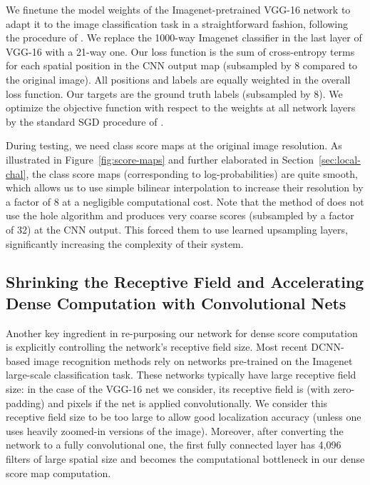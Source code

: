 We finetune the model weights of the Imagenet-pretrained VGG-16 network to
adapt it to the image classification task in a straightforward fashion,
following the procedure of \cite{long2014fully}. We replace the 1000-way
Imagenet classifier in the last layer of VGG-16 with a 21-way one. Our loss
function is the sum of cross-entropy terms for each spatial position in the
CNN output map (subsampled by 8 compared to the original image). All positions
and labels are equally weighted in the overall loss function. Our targets are
the ground truth labels (subsampled by 8). We optimize the objective function
with respect to the weights at all network layers by the standard SGD
procedure of \cite{KrizhevskyNIPS2013}.

During testing, we need class score maps at the original image resolution. As
illustrated in Figure~\ref{fig:score-maps} and further elaborated in
Section~\ref{sec:local-chal}, the class score maps (corresponding to
log-probabilities) are quite smooth, which allows us to use simple bilinear
interpolation to increase their resolution by a factor of 8 at a negligible
computational cost. Note that the method of \cite{long2014fully} does not use
the hole algorithm and produces very coarse scores (subsampled by a factor of
32) at the CNN output. This forced them to use learned upsampling layers,
significantly increasing the complexity of their system.

\subsection{Shrinking the Receptive Field and Accelerating Dense Computation
  with Convolutional Nets}
\label{sec:convnet-field}

Another key ingredient in re-purposing our network for dense score computation
is explicitly controlling the network's receptive field size. Most recent
DCNN-based image recognition methods rely on networks pre-trained on the
Imagenet large-scale classification task. These networks typically have large
receptive field size: in the case of the VGG-16 net we consider, its receptive
field is  (with zero-padding) and  pixels if the net
is applied convolutionally. We consider this receptive field size to be too
large to allow good localization accuracy (unless one uses heavily zoomed-in
versions of the image). Moreover, after converting the network to a fully
convolutional one, the first fully connected layer has 4,096 filters of large
 spatial size and becomes the computational bottleneck in our dense
score map computation.

